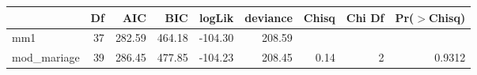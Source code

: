 \begin{table}[ht]
\centering
\begin{tabular}{lrrrrrrrr}
  \hline
 & Df & AIC & BIC & logLik & deviance & Chisq & Chi Df & Pr($>$Chisq) \\ 
  \hline
mm1 & 37 & 282.59 & 464.18 & -104.30 & 208.59 &  &  &  \\ 
  mod\_mariage & 39 & 286.45 & 477.85 & -104.23 & 208.45 & 0.14 & 2 & 0.9312 \\ 
   \hline
\end{tabular}
\end{table}
